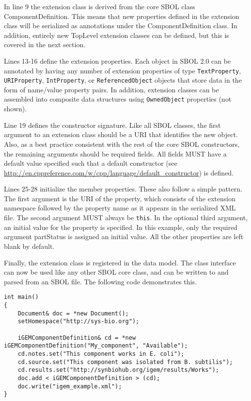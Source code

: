 In line 9 the extension class is derived from the core SBOL class ComponentDefinition. This means that new properties defined in the extension class will be serialized as annotations under the ComponentDefinition class. In addition, entirely new TopLevel extension classes can be defined, but this is covered in the next section.

Lines 13-16 define the extension properties. Each object in SBOL 2.0 can be annotated by having any number of
extension properties of type \lstinline+TextProperty+, \lstinline+URIProperty+, \lstinline+IntProperty+, or \lstinline+ReferencedObject+ objects that store data in the form of name/value property pairs. In addition, extension classes can be assembled into composite data structures using \lstinline+OwnedObject+ properties (not shown). 

Line 19 defines the constructor signature. Like all SBOL classes, the first argument to an extension class should be a URI that identifies the new object. Also, as a best practice consistent with the rest of the core SBOL constructors, the remaining arguments should be required fields. All fields MUST have a default value specified such that a default constructor (see \url{http://en.cppreference.com/w/cpp/language/default_constructor}) is defined.

Lines 25-28 initialize the member properties. These also follow a simple pattern. The first argument is the URI of the property, which consists of the extension namespace followed by the property name as it appears in the serialized XML file. The second argument MUST always be \lstinline+this+. In the optional third argument, an initial value for the property is specified. In this example, only the required argument partStatus is assigned an initial value. All the other properties are left blank by default.

Finally, the extension class is registered in the data model. The class interface can now be used like any other SBOL core class, and can be written to and parsed from an SBOL file. The following code demonstrates this.

\vspace{\abovedisplayskip}
\begin{minipage}{0.95\textwidth} 
\begin{lstlisting}
int main()
{
    Document& doc = *new Document();
    setHomespace("http://sys-bio.org");
    
    iGEMComponentDefinition& cd = *new iGEMComponentDefinition("My_component", "Available");
    cd.notes.set("This component works in E. coli");
    cd.source.set("This component was isolated from B. subtilis");
    cd.results.set("http://synbiohub.org/igem/results/Works");
    doc.add < iGEMComponentDefinition > (cd);
    doc.write("igem_example.xml");
}
\end{lstlisting}
\end{minipage}

